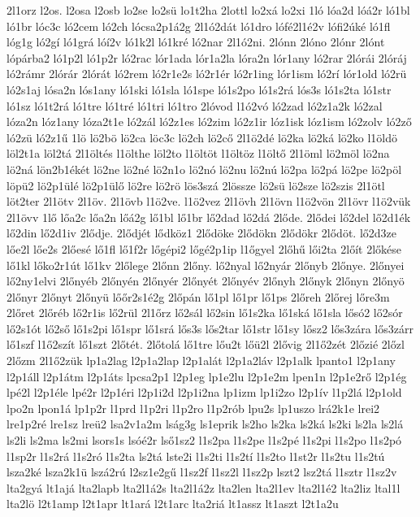 {2l1orz
l2os.
l2osa
l2osb
lo2se
lo2sü
lo1t2ha
2lottl
lo2xá
lo2xi
1ló
lóa2d
lóá2r
ló1bl
ló1br
lóc3c
ló2cem
ló2ch
lócsa2p1á2g
2l1ó2dát
ló1dro
lófé2l1é2v
lófi2úké
ló1fl
lóg1g
ló2gí
ló1grá
lóí2v
ló1k2l
ló1kré
ló2nar
2l1ó2ni.
2lónn
2lóno
2lónr
2lónt
lópárba2
ló1p2l
ló1p2r
ló2rac
lór1ada
lór1a2la
lóra2n
lór1any
ló2rar
2lórái
2lóráj
ló2rámr
2lórár
2lórát
ló2rem
ló2r1e2s
ló2r1ér
ló2r1ing
lór1ism
ló2rí
lór1old
ló2rü
ló2s1aj
lósa2n
lós1any
ló1ski
ló1sla
ló1spe
ló1s2po
ló1s2rá
lós3s
ló1s2ta
ló1str
ló1sz
ló1t2rá
ló1tre
ló1tré
ló1tri
ló1tro
2lóvod
l1ó2vó
ló2zad
ló2z1a2k
ló2zal
lóza2n
lóz1any
lóza2t1e
ló2zál
ló2z1es
ló2zim
ló2z1ir
lóz1isk
lóz1ism
ló2zolv
ló2ző
ló2zü
ló2z1ű
1lö
lö2bö
lö2ca
löc3c
lö2ch
lö2cő
2l1ö2dé
lö2ka
lö2ká
lö2ko
l1öldö
löl2t1a
löl2tá
2l1öltés
l1ölthe
löl2to
l1öltöt
l1öltöz
l1öltő
2l1öml
lö2möl
lö2na
lö2ná
lön2b1ékét
lö2ne
lö2né
lö2n1o
lö2nó
lö2nu
lö2nú
lö2pa
lö2pá
lö2pe
lö2pöl
löpü2
lö2p1ülé
lö2p1ülő
lö2re
lö2rö
lös3szá
2lössze
lö2sü
lö2sze
lö2szis
2l1ötl
löt2ter
2l1ötv
2l1öv.
2l1övb
l1ö2ve.
l1ö2vez
2l1övh
2l1övn
l1ö2vön
2l1övr
l1ö2vük
2l1övv
1lő
lőa2c
lőa2n
lőá2g
lő1bl
lő1br
lő2dad
lő2dá
2lőde.
2lődei
lő2del
lő2d1ék
lő2din
lő2d1iv
2lődje.
2lődjét
lődköz1
2lődöke
2lődökn
2lődökr
2lődöt.
lő2d3ze
lőe2l
lőe2s
2lőesé
lő1fl
lő1f2r
lőgépi2
lőgé2p1ip
l1őgyel
2lőhű
lői2ta
2lőít
2lőkése
lő1kl
lőko2r1út
lő1kv
2lőlege
2lőnn
2lőny.
lő2nyal
lő2nyár
2lőnyb
2lőnye.
2lőnyei
lő2ny1elvi
2lőnyéb
2lőnyén
2lőnyér
2lőnyét
2lőnyév
2lőnyh
2lőnyk
2lőnyn
2lőnyö
2lőnyr
2lőnyt
2lőnyü
lőőr2s1é2g
2lőpán
lő1pl
lő1pr
lő1ps
2lőreh
2lőrej
lőre3m
2lőret
2lőréb
lő2r1is
lő2rül
2l1őrz
lő2sál
lő2sin
lő1s2ka
lő1ská
lő1sla
lősó2
lő2sór
lő2s1ót
lő2ső
lő1s2pi
lő1spr
lő1srá
lős3s
lős2tar
lő1str
lő1sy
lősz2
lős3zára
lős3zárr
lő1szf
l1ő2szít
lő1szt
2lőtét.
2lőtolá
lő1tre
lőu2t
lőü2l
2lővig
2l1ő2zét
2lőzié
2lőzl
2lőzm
2l1ő2zük
lp1a2lag
l2p1a2lap
l2p1alát
l2p1a2láv
l2p1alk
lpanto1
l2p1any
l2p1áll
l2p1átm
l2p1áts
lpcsa2p1
l2p1eg
lp1e2lu
l2p1e2m
lpen1n
l2p1e2rő
l2p1ég
lpé2l
l2p1éle
lpé2r
l2p1éri
l2p1i2d
l2p1i2na
lp1izm
lp1i2zo
l2p1ív
l1p2lá
l2p1old
lpo2n
lpon1á
lp1p2r
l1prd
l1p2ri
l1p2ro
l1p2rób
lpu2s
lp1uszo
lrá2k1e
lrei2
lre1p2ré
lre1sz
lreü2
lsa2v1a2m
lság3g
ls1eprik
ls2ho
ls2ka
ls2ká
ls2ki
ls2la
ls2lá
ls2li
ls2ma
ls2mi
lsors1s
lsóé2r
lső1sz2
l1s2pa
l1s2pe
l1s2pé
l1s2pi
l1s2po
l1s2pó
l1sp2r
l1s2rá
l1s2ró
l1s2ta
ls2tá
lste2i
l1s2ti
l1s2tí
l1s2to
l1st2r
l1s2tu
l1s2tú
lsza2ké
lsza2k1ü
lszá2rú
l2sz1e2gű
l1sz2f
l1sz2l
l1sz2p
lszt2
lsz2tá
l1sztr
l1sz2v
lta2gyá
lt1ajá
lta2lapb
lta2l1á2s
lta2l1á2z
lta2len
lta2l1ev
lta2l1é2
lta2liz
ltal1l
lta2lö
l2t1amp
l2t1apr
lt1ará
l2t1arc
lta2riá
lt1assz
lt1aszt
l2t1a2u
}
